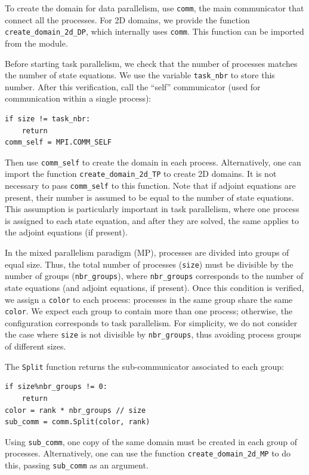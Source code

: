 \documentclass[preprint,9pt]{elsarticle}
\begin{document}
To create the domain for data parallelism, use \texttt{comm},
the main communicator that connect all the processes.
For 2D domains, we provide the function
\texttt{create\_domain\_2d\_DP}, which internally uses \texttt{comm}.
This function can be imported from the module.

Before starting task parallelism, we check that the number of processes matches
the number of state equations. We use the variable
\texttt{task\_nbr} to store this number.
After this verification, call the ``self'' communicator
(used for communication within a single process):
\begin{lstlisting}
if size != task_nbr:
    return
comm_self = MPI.COMM_SELF
\end{lstlisting}
Then use \texttt{comm\_self} to create the domain in each process.
Alternatively, one can import the function \texttt{create\_domain\_2d\_TP}
to create 2D domains.
It is not necessary to pass \texttt{comm\_self} to this function.
Note that if adjoint equations are present,
their number is assumed to be equal to the number of state equations.
This assumption is particularly important in task parallelism,
where one process is assigned to each state equation,
and after they are solved,
the same applies to the adjoint equations (if present).

In the mixed parallelism paradigm (MP),
processes are divided into groups of equal size.
Thus, the total number of processes (\texttt{size}) must be divisible
by the number of groups (\texttt{nbr\_groups}), where \texttt{nbr\_groups}
corresponds to the number of state equations
(and adjoint equations, if present).
Once this condition is verified, we assign a \texttt{color} to each process:
processes in the same group share the same \texttt{color}.
We expect each group to contain more than one process;
otherwise, the configuration corresponds to task parallelism.
For simplicity, we do not consider the case where \texttt{size}
is not divisible by \texttt{nbr\_groups},
thus avoiding process groups of different sizes.

The \texttt{Split} function returns the sub-communicator
associated to each group:
\begin{lstlisting}
if size%nbr_groups != 0:
	return
color = rank * nbr_groups // size
sub_comm = comm.Split(color, rank)
\end{lstlisting}
Using \texttt{sub\_comm}, one copy of the same domain must be created
in each group of processes. Alternatively, one can use the function
\texttt{create\_domain\_2d\_MP} to do this,
passing \texttt{sub\_comm} as an argument.
\end{document}
